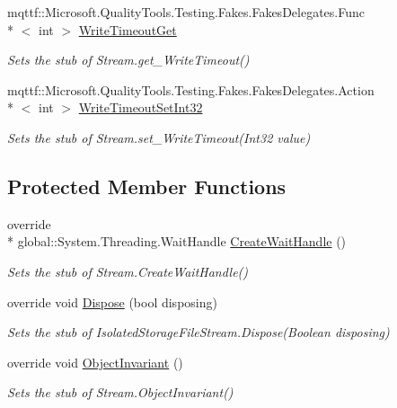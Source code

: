 \begin{DoxyCompactItemize}
mqttf\-::\-Microsoft.\-Quality\-Tools.\-Testing.\-Fakes.\-Fakes\-Delegates.\-Func\\*
$<$ int $>$ \hyperlink{class_system_1_1_i_o_1_1_isolated_storage_1_1_fakes_1_1_stub_isolated_storage_file_stream_a6ffb4ca1b30538396f5b1beeee144f03}{Write\-Timeout\-Get}
\begin{DoxyCompactList}\small\item\em Sets the stub of Stream.\-get\-\_\-\-Write\-Timeout()\end{DoxyCompactList}\item 
mqttf\-::\-Microsoft.\-Quality\-Tools.\-Testing.\-Fakes.\-Fakes\-Delegates.\-Action\\*
$<$ int $>$ \hyperlink{class_system_1_1_i_o_1_1_isolated_storage_1_1_fakes_1_1_stub_isolated_storage_file_stream_abd43949c518fd57790bcca1e135a95bf}{Write\-Timeout\-Set\-Int32}
\begin{DoxyCompactList}\small\item\em Sets the stub of Stream.\-set\-\_\-\-Write\-Timeout(\-Int32 value)\end{DoxyCompactList}\end{DoxyCompactItemize}
\subsection*{Protected Member Functions}
\begin{DoxyCompactItemize}
\item 
override \\*
global\-::\-System.\-Threading.\-Wait\-Handle \hyperlink{class_system_1_1_i_o_1_1_isolated_storage_1_1_fakes_1_1_stub_isolated_storage_file_stream_a2403e740b673ec4d960b97bdd2c4841b}{Create\-Wait\-Handle} ()
\begin{DoxyCompactList}\small\item\em Sets the stub of Stream.\-Create\-Wait\-Handle()\end{DoxyCompactList}\item 
override void \hyperlink{class_system_1_1_i_o_1_1_isolated_storage_1_1_fakes_1_1_stub_isolated_storage_file_stream_a003fa114f86add5e6b29a0b21442a4d3}{Dispose} (bool disposing)
\begin{DoxyCompactList}\small\item\em Sets the stub of Isolated\-Storage\-File\-Stream.\-Dispose(\-Boolean disposing)\end{DoxyCompactList}\item 
override void \hyperlink{class_system_1_1_i_o_1_1_isolated_storage_1_1_fakes_1_1_stub_isolated_storage_file_stream_af2a6fbf66161c2801012913ed9f9c40b}{Object\-Invariant} ()
\begin{DoxyCompactList}\small\item\em Sets the stub of Stream.\-Object\-Invariant()\end{DoxyCompactList}\end{DoxyCompactItemize}
